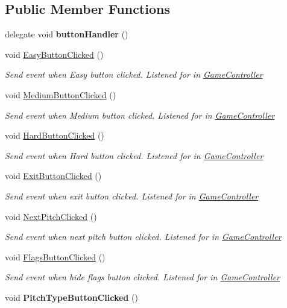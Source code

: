 \subsection*{Public Member Functions}
\begin{DoxyCompactItemize}
\item 
delegate void {\bfseries button\+Handler} ()\hypertarget{class_u_i_events_ab297f62bccd2409aa695de14979daf0f}{}\label{class_u_i_events_ab297f62bccd2409aa695de14979daf0f}

\item 
void \hyperlink{class_u_i_events_a10c80cd4426008cc8c84ad4a524e6ce7}{Easy\+Button\+Clicked} ()
\begin{DoxyCompactList}\small\item\em Send event when Easy button clicked. Listened for in \hyperlink{class_game_controller}{Game\+Controller} \end{DoxyCompactList}\item 
void \hyperlink{class_u_i_events_a8cd61162b65eb96874d1b952882fcdb1}{Medium\+Button\+Clicked} ()
\begin{DoxyCompactList}\small\item\em Send event when Medium button clicked. Listened for in \hyperlink{class_game_controller}{Game\+Controller} \end{DoxyCompactList}\item 
void \hyperlink{class_u_i_events_a73230a7a085d29a621593f0d07ab34a2}{Hard\+Button\+Clicked} ()
\begin{DoxyCompactList}\small\item\em Send event when Hard button clicked. Listened for in \hyperlink{class_game_controller}{Game\+Controller} \end{DoxyCompactList}\item 
void \hyperlink{class_u_i_events_a0338efe693cac9a52735052eb08542c2}{Exit\+Button\+Clicked} ()
\begin{DoxyCompactList}\small\item\em Send event when exit button clicked. Listened for in \hyperlink{class_game_controller}{Game\+Controller} \end{DoxyCompactList}\item 
void \hyperlink{class_u_i_events_a0f353ad5a99c77a80322945fe4c8e2eb}{Next\+Pitch\+Clicked} ()
\begin{DoxyCompactList}\small\item\em Send event when next pitch button clicked. Listened for in \hyperlink{class_game_controller}{Game\+Controller} \end{DoxyCompactList}\item 
void \hyperlink{class_u_i_events_a1cf0319203ea3b2d8999421a5d8d2d38}{Flags\+Button\+Clicked} ()
\begin{DoxyCompactList}\small\item\em Send event when hide flags button clicked. Listened for in \hyperlink{class_game_controller}{Game\+Controller} \end{DoxyCompactList}\item 
void {\bfseries Pitch\+Type\+Button\+Clicked} ()\hypertarget{class_u_i_events_aafd2c0120c66b38986e194cc8267f21e}{}\label{class_u_i_events_aafd2c0120c66b38986e194cc8267f21e}


\end{DoxyCompactItemize}
